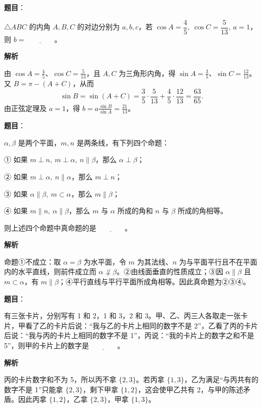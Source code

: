 \begin{answer}

\textbf{题目}：

\(\triangle ABC\) 的内角 \(A,B,C\) 的对边分别为 \(a,b,c\)，若 \(\cos A=\dfrac45,\ \cos C=\dfrac5{13},\ a=1\)，则 \(b=\underline{\qquad\qquad}\)。

\textbf{解析}

由 \(\cos A=\frac45\)、\(\cos C=\frac5{13}\)，且 \(A,C\) 为三角形内角，得 \(\sin A=\frac35\)、\(\sin C=\frac{12}{13}\)。又 \(B=\pi-(A+C)\)，从而
\nopagebreak[4]
\[
\sin B=\sin(A+C)=\frac35\cdot\frac5{13}+\frac45\cdot\frac{12}{13}=\frac{63}{65}.
\]
由正弦定理及 \(a=1\)，得 \(b=a\frac{\sin B}{\sin A}=\frac{21}{13}\)。


\end{answer}
\begin{answer}

\textbf{题目}：

\(\alpha,\beta\) 是两个平面，\(m,n\) 是两条线，有下列四个命题：

   ① 如果 \(m\perp n,\ m\perp\alpha,\ n\parallel\beta\)，那么 \(\alpha\perp\beta\)；

   ② 如果 \(m\perp\alpha,\ n\parallel\alpha\)，那么 \(m\perp n\)；

   ③ 如果 \(\alpha\parallel\beta,\ m\subset\alpha\)，那么 \(m\parallel\beta\)；

   ④ 如果 \(m\parallel n,\ \alpha\parallel\beta\)，那么 \(m\) 与 \(\alpha\) 所成的角和 \(n\) 与 \(\beta\) 所成的角相等。

   则上述四个命题中真命题的是\(\underline{\qquad\qquad}\)。

\textbf{解析}

命题①不成立：取 \(\alpha=\beta\) 为水平面，令 \(m\) 为其法线、\(n\) 为与平面平行且不在平面内的水平直线，则前件成立而 \(\alpha\not\perp\beta\)。②由线面垂直的性质成立；③因 \(\alpha\parallel\beta\) 且 \(m\subset\alpha\)，有 \(m\parallel\beta\)；④平行直线与平行平面所成角相等。因此真命题为②③④。


\end{answer}
\begin{answer}

\textbf{题目}：

有三张卡片，分别写有 1 和 2，1 和 3，2 和 3。甲、乙、丙三人各取走一张卡片，甲看了乙的卡片后说：“我与乙的卡片上相同的数字不是 2”，乙看了丙的卡片后说：“我与丙的卡片上相同的数字不是 1”，丙说：“我的卡片上的数字之和不是 5”，则甲的卡片上的数字是\(\underline{\qquad\qquad}\)。

\textbf{解析}

丙的卡片数字和不为 5，所以丙不拿 \(\{2,3\}\)。若丙拿 \(\{1,3\}\)，乙为满足“与丙共有的数字不是 1”只能拿 \(\{2,3\}\)，剩下甲拿 \(\{1,2\}\)，这会使甲乙共有 2，与甲的陈述矛盾。因此丙拿 \(\{1,2\}\)，乙拿 \(\{2,3\}\)，甲拿 \(\{1,3\}\)。


\end{answer}
